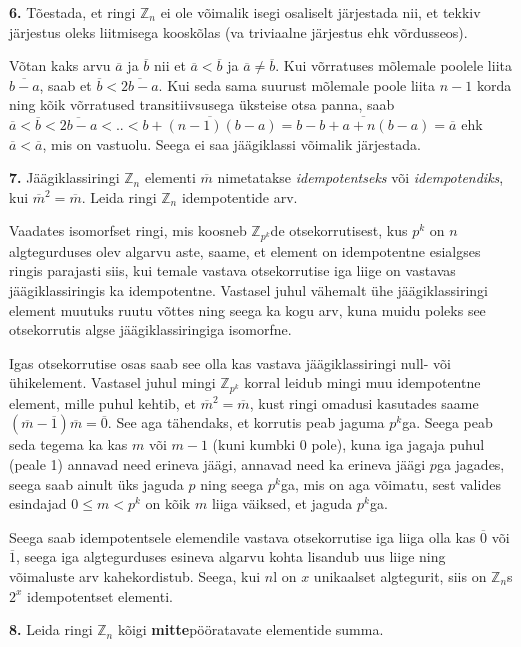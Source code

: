 \documentclass[a4paper, 10pt]{article}
\newcommand{\Z}{\mathbb{Z}}
\newcommand{\w}{\overline}
\begin{document}
\noindent \textbf{6.} Tõestada, et ringi $\Z_n$ ei ole võimalik isegi osaliselt järjestada nii, et tekkiv järjestus oleks liitmisega kooskõlas (va triviaalne järjestus ehk võrdusseos). 

\bigskip
Võtan kaks arvu $\w a$ ja $\w b$ nii et $\w a<\w b$ ja $\w a \neq \w b$. Kui võrratuses mõlemale poolele liita $\w{b-a}$, saab et $\w b<\w{2b-a}$. Kui seda sama suurust mõlemale poole liita $n-1$ korda ning kõik võrratused transitiivsusega üksteise otsa panna, saab $\w a < \w b < \w {2b-a} < .. < \w{b+(n-1)(b-a)}=\w{b-b+a+n(b-a)}=\w a$ ehk $\w a<\w a$, mis on vastuolu. Seega ei saa jäägiklassi võimalik järjestada.
\bigskip

\noindent \textbf{7.} Jäägiklassiringi $\Z_n$ elementi $\overline{m}$ nimetatakse \emph{idempotentseks} või \emph{idempotendiks}, kui $\overline{m}^2=\overline{m}$. Leida ringi $\Z_n$ idempotentide arv. 

\bigskip
Vaadates isomorfset ringi, mis koosneb $\Z_{p^k}$de otsekorrutisest, kus $p^k$ on $n$ algtegurduses olev algarvu aste, saame, et element on idempotentne esialgses ringis parajasti siis, kui temale vastava otsekorrutise iga liige on vastavas jäägiklassiringis ka idempotentne. Vastasel juhul vähemalt ühe jäägiklassiringi element muutuks ruutu võttes ning seega ka kogu arv, kuna muidu poleks see otsekorrutis algse jäägiklassiringiga isomorfne.

Igas otsekorrutise osas saab see olla kas vastava jäägiklassiringi null- või ühikelement. Vastasel juhul mingi $\Z_{p^k}$ korral leidub mingi muu idempotentne element, mille puhul kehtib, et $\overline{m}^2=\overline{m}$, kust ringi omadusi kasutades saame $(\overline{m}-\overline{1})\overline{m}=\overline{0}$. See aga tähendaks, et korrutis peab jaguma $p^k$ga. Seega peab seda tegema ka kas $m$ või $m-1$ (kuni kumbki 0 pole), kuna iga jagaja puhul (peale 1) annavad need erineva jäägi, annavad need ka erineva jäägi $p$ga jagades, seega saab ainult üks jaguda $p$ ning seega $p^k$ga, mis on aga võimatu, sest valides esindajad $0\leq m<p^k$ on kõik $m$ liiga väiksed, et jaguda $p^k$ga.

Seega saab idempotentsele elemendile vastava otsekorrutise iga liiga olla kas $\overline{0}$ või $\overline{1}$, seega iga algtegurduses esineva algarvu kohta lisandub uus liige ning võimaluste arv kahekordistub. Seega, kui $n$l on $x$ unikaalset algtegurit, siis on $\Z_n$s $2^x$ idempotentset elementi.
\bigskip

\noindent \textbf{8.} Leida ringi $\Z_n$ kõigi {\bf mitte}pööratavate elementide summa. 
\end{document}
